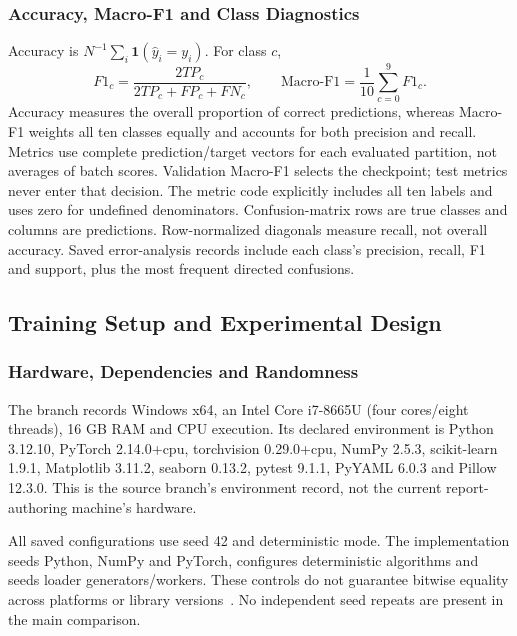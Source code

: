 \subsubsection{Accuracy, Macro-F1 and Class Diagnostics}
Accuracy is $N^{-1}\sum_i\mathbf1(\hat y_i=y_i)$. For class $c$,
\begin{equation}
F1_c=\frac{2TP_c}{2TP_c+FP_c+FN_c},\qquad
\mathrm{Macro\mbox{-}F1}=\frac1{10}\sum_{c=0}^{9}F1_c.
\end{equation}
Accuracy measures the overall proportion of correct predictions, whereas Macro-F1 weights all ten classes equally and accounts for both precision and recall. Metrics use complete prediction/target vectors for each evaluated partition, not averages of batch scores. Validation Macro-F1 selects the checkpoint; test metrics never enter that decision. The metric code explicitly includes all ten labels and uses zero for undefined denominators. Confusion-matrix rows are true classes and columns are predictions. Row-normalized diagonals measure recall, not overall accuracy. Saved error-analysis records include each class's precision, recall, F1 and support, plus the most frequent directed confusions.

\subsection{Training Setup and Experimental Design}
\subsubsection{Hardware, Dependencies and Randomness}
The branch records Windows x64, an Intel Core i7-8665U (four cores/eight threads), 16 GB RAM and CPU execution. Its declared environment is Python 3.12.10, PyTorch 2.14.0+cpu, torchvision 0.29.0+cpu, NumPy 2.5.3, scikit-learn 1.9.1, Matplotlib 3.11.2, seaborn 0.13.2, pytest 9.1.1, PyYAML 6.0.3 and Pillow 12.3.0. This is the source branch's environment record, not the current report-authoring machine's hardware.

All saved configurations use seed 42 and deterministic mode. The implementation seeds Python, NumPy and PyTorch, configures deterministic algorithms and seeds loader generators/workers. These controls do not guarantee bitwise equality across platforms or library versions~\cite{pytorchrepro}. No independent seed repeats are present in the main comparison.

